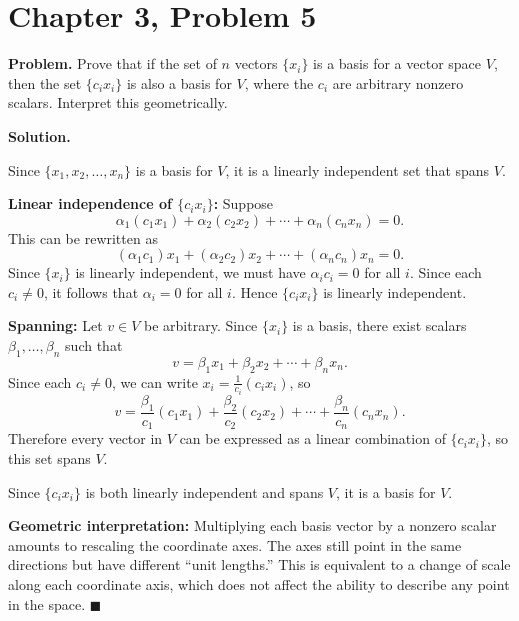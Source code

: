 \documentclass[12pt]{article}
\begin{document}
\section*{Chapter 3, Problem 5}

\textbf{Problem.} Prove that if the set of $n$ vectors $\{x_i\}$ is a basis for a vector space $V$, then the set $\{c_i x_i\}$ is also a basis for $V$, where the $c_i$ are arbitrary nonzero scalars. Interpret this geometrically.

\bigskip
\textbf{Solution.}

Since $\{x_1, x_2, \ldots, x_n\}$ is a basis for $V$, it is a linearly independent set that spans $V$.

\medskip
\textbf{Linear independence of $\{c_i x_i\}$:} Suppose
\[
\alpha_1 (c_1 x_1) + \alpha_2 (c_2 x_2) + \cdots + \alpha_n (c_n x_n) = 0.
\]
This can be rewritten as
\[
(\alpha_1 c_1) x_1 + (\alpha_2 c_2) x_2 + \cdots + (\alpha_n c_n) x_n = 0.
\]
Since $\{x_i\}$ is linearly independent, we must have $\alpha_i c_i = 0$ for all $i$. Since each $c_i \neq 0$, it follows that $\alpha_i = 0$ for all $i$. Hence $\{c_i x_i\}$ is linearly independent.

\medskip
\textbf{Spanning:} Let $v \in V$ be arbitrary. Since $\{x_i\}$ is a basis, there exist scalars $\beta_1, \ldots, \beta_n$ such that
\[
v = \beta_1 x_1 + \beta_2 x_2 + \cdots + \beta_n x_n.
\]
Since each $c_i \neq 0$, we can write $x_i = \frac{1}{c_i}(c_i x_i)$, so
\[
v = \frac{\beta_1}{c_1}(c_1 x_1) + \frac{\beta_2}{c_2}(c_2 x_2) + \cdots + \frac{\beta_n}{c_n}(c_n x_n).
\]
Therefore every vector in $V$ can be expressed as a linear combination of $\{c_i x_i\}$, so this set spans $V$.

\medskip
Since $\{c_i x_i\}$ is both linearly independent and spans $V$, it is a basis for $V$.

\medskip
\textbf{Geometric interpretation:} Multiplying each basis vector by a nonzero scalar amounts to rescaling the coordinate axes. The axes still point in the same directions but have different ``unit lengths.'' This is equivalent to a change of scale along each coordinate axis, which does not affect the ability to describe any point in the space. \hfill $\blacksquare$
\end{document}
